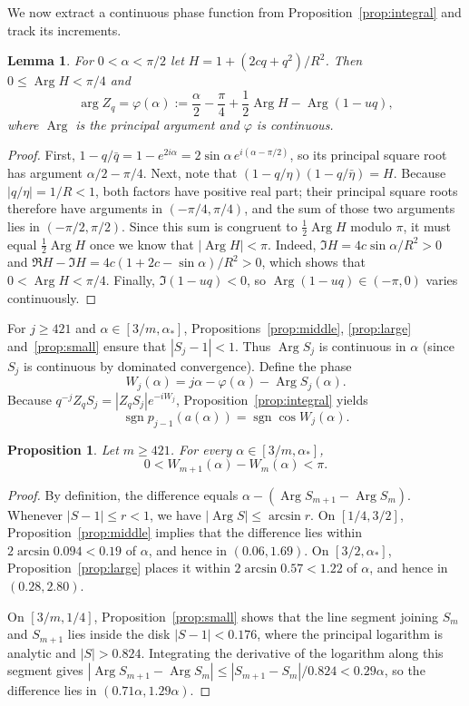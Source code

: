 \documentclass[11pt]{amsart}
\newtheorem{lemma}[theorem]{Lemma}
\newtheorem{proposition}[theorem]{Proposition}
\theoremstyle{remark}
\newcommand{\Arg}{\operatorname{Arg}}
\newcommand{\sgn}{\operatorname{sgn}}
\begin{document}
We now extract a continuous phase function from
Proposition~\ref{prop:integral} and track its increments.

\begin{lemma}\label{lem:argZ}
For $0<\alpha<\pi/2$ let $H=1+(2cq+q^2)/R^2$. Then $0\le\Arg H<\pi/4$ and
\[
 \arg Z_q=\varphi(\alpha):=\frac\alpha2-\frac\pi4+\frac12\Arg H-\Arg(1-uq),
\]
where $\Arg$ is the principal argument and $\varphi$ is continuous.
\end{lemma}

\begin{proof}
First, $1-q/\bar q=1-e^{2i\alpha}=2\sin\alpha\,e^{i(\alpha-\pi/2)}$, so its
principal square root has argument $\alpha/2-\pi/4$. Next, note that
$(1-q/\eta)(1-q/\bar\eta)=H$. Because $|q/\eta|=1/R<1$, both factors have
positive real part; their principal square roots therefore have arguments in
$(-\pi/4,\pi/4)$, and the sum of those two arguments lies in
$(-\pi/2,\pi/2)$. Since this sum is congruent to $\frac12\Arg H$ modulo
$\pi$, it must equal $\frac12\Arg H$ once we know that $|\Arg H|<\pi$.
Indeed, $\Im H=4c\sin\alpha/R^2>0$ and
$\Re H-\Im H=4c(1+2c-\sin\alpha)/R^2>0$, which shows that $0<\Arg H<\pi/4$.
Finally, $\Im(1-uq)<0$, so $\Arg(1-uq)\in(-\pi,0)$ varies continuously.
\end{proof}

For $j\ge421$ and $\alpha\in[3/m,\alpha_*]$, Propositions~\ref{prop:middle},
\ref{prop:large} and~\ref{prop:small} ensure that $|S_j-1|<1$. Thus
$\Arg S_j$ is continuous in $\alpha$ (since $S_j$ is continuous by dominated
convergence). Define the phase
\[
 W_j(\alpha)=j\alpha-\varphi(\alpha)-\Arg S_j(\alpha).
\]
Because $q^{-j}Z_qS_j=|Z_qS_j|e^{-iW_j}$, Proposition~\ref{prop:integral}
yields
\begin{equation}\label{eq:sign}
 \sgn p_{j-1}(a(\alpha))=\sgn\cos W_j(\alpha).
\end{equation}

\begin{proposition}\label{prop:gap}
Let $m\ge421$. For every $\alpha\in[3/m,\alpha_*]$,
\[
 0<W_{m+1}(\alpha)-W_m(\alpha)<\pi .
\]
\end{proposition}

\begin{proof}
By definition, the difference equals $\alpha-(\Arg S_{m+1}-\Arg S_m)$.
Whenever $|S-1|\le r<1$, we have $|\Arg S|\le\arcsin r$. On $[1/4,3/2]$,
Proposition~\ref{prop:middle} implies that the difference lies within
$2\arcsin0.094<0.19$ of $\alpha$, and hence in $(0.06,1.69)$. On
$[3/2,\alpha_*]$, Proposition~\ref{prop:large} places it within
$2\arcsin0.57<1.22$ of $\alpha$, and hence in $(0.28,2.80)$.

On $[3/m,1/4]$, Proposition~\ref{prop:small} shows that the line segment
joining $S_m$ and $S_{m+1}$ lies inside the disk $|S-1|<0.176$, where the
principal logarithm is analytic and $|S|>0.824$. Integrating the derivative
of the logarithm along this segment gives
$|\Arg S_{m+1}-\Arg S_m|\le|S_{m+1}-S_m|/0.824<0.29\alpha$, so the
difference lies in $(0.71\alpha,1.29\alpha)$.
\end{proof}
\end{document}
